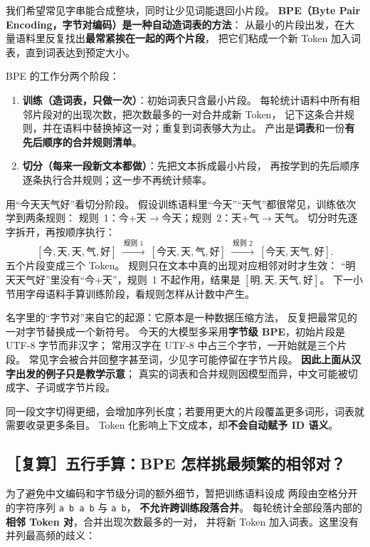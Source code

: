 我们希望常见字串能合成整块，同时让少见词能退回小片段。
\textbf{BPE（Byte Pair Encoding，字节对编码）是一种自动造词表的方法}：
从最小的片段出发，在大量语料里反复找出\textbf{最常紧挨在一起的两个片段}，
把它们粘成一个新 Token 加入词表，直到词表达到预定大小。

BPE 的工作分两个阶段：
\begin{enumerate}[leftmargin=2em,itemsep=2pt,topsep=3pt]
\item \textbf{训练（造词表，只做一次）}：初始词表只含最小片段。
每轮统计语料中所有相邻片段对的出现次数，把次数最多的一对合并成新 Token，
记下这条合并规则，并在语料中替换掉这一对；重复到词表够大为止。
产出是\textbf{词表}和一份\textbf{有先后顺序的合并规则清单}。
\item \textbf{切分（每来一段新文本都做）}：先把文本拆成最小片段，
再按学到的先后顺序逐条执行合并规则；这一步不再统计频率。
\end{enumerate}

用“今天天气好”看切分阶段。
假设训练语料里“今天”“天气”都很常见，训练依次学到两条规则：
规则~1：今+天$\to$今天；规则~2：天+气$\to$天气。
切分时先逐字拆开，再按顺序执行：
\[
[\text{今},\text{天},\text{天},\text{气},\text{好}]
\ \xrightarrow{\ \text{规则 1}\ }\
[\text{今天},\text{天},\text{气},\text{好}]
\ \xrightarrow{\ \text{规则 2}\ }\
[\text{今天},\text{天气},\text{好}].
\]
五个片段变成三个 Token。
规则只在文本中真的出现对应相邻对时才生效：
“明天天气好”里没有“今+天”，规则~1 不起作用，结果是 $[\text{明},\text{天},\text{天气},\text{好}]$。
下一小节用字母语料手算训练阶段，看规则怎样从计数中产生。

名字里的“字节对”来自它的起源：它原本是一种数据压缩方法，
反复把最常见的一对字节替换成一个新符号。
今天的大模型多采用\textbf{字节级 BPE}，初始片段是 UTF-8 字节而非汉字；
常用汉字在 UTF-8 中占三个字节，一开始就是三个片段。
常见字会被合并回整字甚至词，少见字可能停留在字节片段。
\textbf{因此上面从汉字出发的例子只是教学示意}；
真实的词表和合并规则因模型而异，中文可能被切成字、子词或字节片段。

同一段文字切得更细，会增加序列长度；若要用更大的片段覆盖更多词形，词表就需要收录更多条目。
Token 化影响上下文成本，却\textbf{不会自动赋予 ID 语义}。


\subsection{［复算］五行手算：BPE 怎样挑最频繁的相邻对？}

为了避免中文编码和字节级分词的额外细节，暂把训练语料设成
两段由空格分开的字符序列 \texttt{a b a b} 与 \texttt{a b}，
\textbf{不允许跨训练段落合并}。
\Needspace{14\baselineskip}
每轮统计全部段落内部的\textbf{相邻 Token 对}，合并出现次数最多的一对，
并将新 Token 加入词表。这里没有并列最高频的歧义：

